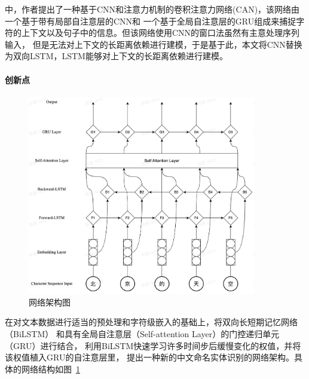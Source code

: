 \parencite{zhu2019can}中，作者提出了一种基于CNN和注意力机制的卷积注意力网络(CAN)，该网络由一个基于带有局部自注意层的CNN和
一个基于全局自注意层的GRU组成来捕捉字符的上下文以及句子中的信息。但该网络使用CNN的窗口法虽然有主意处理序列输入，
但是无法对上下文的长距离依赖进行建模，于是基于此，本文将CNN替换为双向LSTM，LSTM能够对上下文的长距离依赖进行建模。


\paragraph{创新点}

\begin{figure}[!htp]
    \centering
    \label{fig:network_architecture}
    \includegraphics[width=10cm]{figures/network_architecture.jpeg}
    \caption{网络架构图}
\end{figure}

在对文本数据进行适当的预处理和字符级嵌入的基础上，将双向长短期记忆网络（BiLSTM）
和具有全局自注意层（Self-attention Layer）的门控递归单元（GRU）进行结合，
利用BiLSTM快速学习许多时间步后缓慢变化的权值，并将该权值植入GRU的自注意层里，
提出一种新的中文命名实体识别的网络架构。具体的网络结构如图~\ref{fig:network_architecture}





